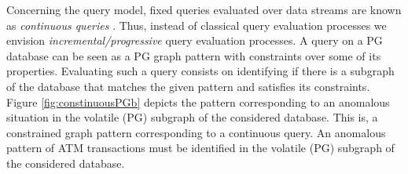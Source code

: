 {\noindent
Concerning the query model, fixed queries evaluated over data streams are known 
as \emph{continuous queries} \cite{CQ-babu2001continuous,CQ-zaniolo2012logical}. 
Thus, instead of classical query evaluation processes we envision \emph{incremental/progressive} 
query evaluation processes. 
A query on a PG database can be seen as a PG graph pattern with 
constraints over some of its properties. 
Evaluating such a query consists on identifying if there is a 
subgraph of the database that matches 
the given pattern and satisfies its constraints. 
Figure \ref{fig:constinuousPGb} depicts the pattern 
corresponding to an anomalous situation in 
the volatile (PG) subgraph of the considered database. 
This is, a constrained graph pattern corresponding to a continuous query. 
An  anomalous pattern of ATM transactions must be identified in 
the volatile (PG) subgraph of the considered database.\\

}
